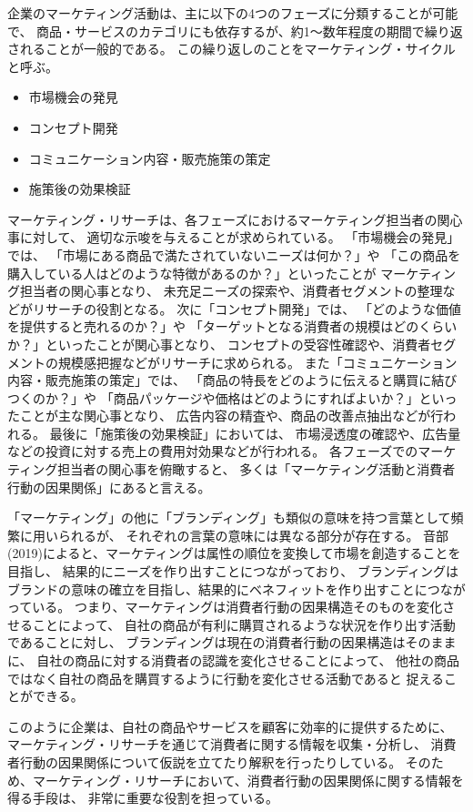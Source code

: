 企業のマーケティング活動は、主に以下の4つのフェーズに分類することが可能で、
商品・サービスのカテゴリにも依存するが、約1〜数年程度の期間で繰り返されることが一般的である。
この繰り返しのことをマーケティング・サイクルと呼ぶ。
\begin{itemize}
  \item 市場機会の発見
  \item コンセプト開発
  \item コミュニケーション内容・販売施策の策定
  \item 施策後の効果検証
\end{itemize}
マーケティング・リサーチは、各フェーズにおけるマーケティング担当者の関心事に対して、
適切な示唆を与えることが求められている。
「市場機会の発見」では、
「市場にある商品で満たされていないニーズは何か？」や
「この商品を購入している人はどのような特徴があるのか？」といったことが
マーケティング担当者の関心事となり、
未充足ニーズの探索や、消費者セグメントの整理などがリサーチの役割となる。
次に「コンセプト開発」では、
「どのような価値を提供すると売れるのか？」や
「ターゲットとなる消費者の規模はどのくらいか？」といったことが関心事となり、
コンセプトの受容性確認や、消費者セグメントの規模感把握などがリサーチに求められる。
また「コミュニケーション内容・販売施策の策定」では、
「商品の特長をどのように伝えると購買に結びつくのか？」や
「商品パッケージや価格はどのようにすればよいか？」といったことが主な関心事となり、
広告内容の精査や、商品の改善点抽出などが行われる。
最後に「施策後の効果検証」においては、
市場浸透度の確認や、広告量などの投資に対する売上の費用対効果などが行われる。
各フェーズでのマーケティング担当者の関心事を俯瞰すると、
多くは「マーケティング活動と消費者行動の因果関係」にあると言える。

「マーケティング」の他に「ブランディング」も類似の意味を持つ言葉として頻繁に用いられるが、
それぞれの言葉の意味には異なる部分が存在する。
音部(2019)\cite{2019-eb}によると、マーケティングは属性の順位を変換して市場を創造することを目指し、
結果的にニーズを作り出すことにつながっており、
ブランディングはブランドの意味の確立を目指し、結果的にベネフィットを作り出すことにつながっている。
つまり、マーケティングは消費者行動の因果構造そのものを変化させることによって、
自社の商品が有利に購買されるような状況を作り出す活動であることに対し、
ブランディングは現在の消費者行動の因果構造はそのままに、
自社の商品に対する消費者の認識を変化させることによって、
他社の商品ではなく自社の商品を購買するように行動を変化させる活動であると
捉えることができる。

このように企業は、自社の商品やサービスを顧客に効率的に提供するために、
マーケティング・リサーチを通じて消費者に関する情報を収集・分析し、
消費者行動の因果関係について仮説を立てたり解釈を行ったりしている。
そのため、マーケティング・リサーチにおいて、消費者行動の因果関係に関する情報を得る手段は、
非常に重要な役割を担っている。

